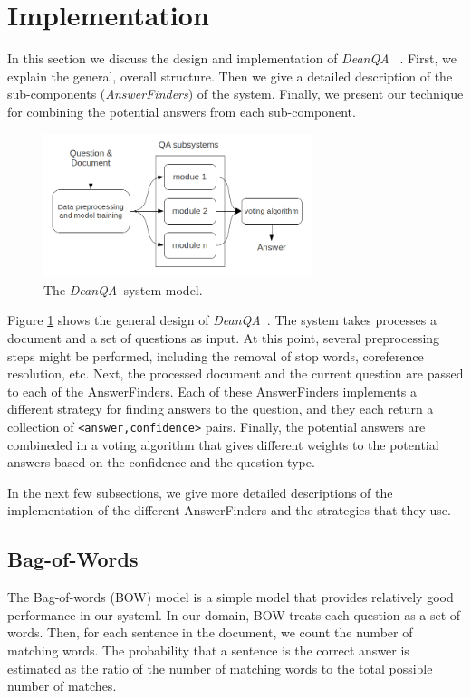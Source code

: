 \documentclass[11pt,letterpaper]{article}
\newcommand{\name}{\emph{DeanQA~}}
\begin{document}
\section{Implementation}
\label{sec:implementation}

In this section we discuss the design and implementation of \name
. First, we explain the general, overall structure. Then we give
a detailed description of the sub-components (\emph{AnswerFinders}) of
the system. Finally, we present our technique for combining the
potential answers from each sub-component.

\begin{figure} 
	\centering
	\includegraphics[width=0.7\textwidth]{model.png}
	\caption{The \name system model.}
	\label{fig:model}
\end{figure}

Figure \ref{fig:model} shows the general design of \name.
The system takes processes a document and a set of questions as input.
At this point, several preprocessing steps might be performed,
including the removal of stop words, coreference resolution, etc.
Next, the processed document and the current question are passed to
each of the AnswerFinders. Each of these AnswerFinders implements a
different strategy for finding answers to the question, and they
each return a collection of \texttt{<answer,confidence>} pairs.
Finally, the potential answers are combineded in a voting algorithm
that gives different weights to the potential answers based on the
confidence and the question type.

In the next few subsections, we give more detailed descriptions of
the implementation of the different AnswerFinders and the
strategies that they use.

\subsection{Bag-of-Words}

The Bag-of-words (BOW) model is a simple model that provides
relatively good performance in our systeml. In our domain, BOW treats
each question as a set of words. Then, for each sentence in the
document, we count the number of matching words. The probability that
a sentence is the correct answer is estimated as the ratio of the
number of matching words to the total possible number of matches.
\end{document}
